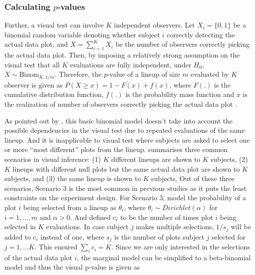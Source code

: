 \documentclass[]{interact}
\theoremstyle{plain}%
\theoremstyle{definition}
\theoremstyle{remark}
\begin{document}
\hypertarget{calculating-p-values}{%
\subsubsection{\texorpdfstring{Calculating
\(p\)-values}{Calculating p-values}}\label{calculating-p-values}}

Further, a visual test can involve \(K\) independent observers. Let
\(X_i = \{0,1\}\) be a binomial random variable denoting whether subject
\(i\) correctly detecting the actual data plot, and
\(X = \sum_{i=1}^{K}X_i\) be the number of observers correctly picking
the actual data plot. Then, by imposing a relatively strong assumption
on the visual test that all \(K\) evaluations are fully independent,
under \(H_0\), \(X \sim \mathrm{Binom}_{K,1/m}\). Therefore, the
\(p\)-value of a lineup of size \(m\) evaluated by \(K\) observer is
given as \(P(X \geq x) = 1 - F(x) + f(x)\), where \(F(.)\) is the
cumulative distribution function, \(f(.)\) is the probability mass
function and \(x\) is the realization of number of observers correctly
picking the actual data plot \citep{majumder_validation_2013}.

As pointed out by \citet{vanderplas2021statistical}, this basic binomial
model doesn't take into account the possible dependencies in the visual
test due to repeated evaluations of the same lineup. And it is
inapplicable to visual test where subjects are asked to select one or
more ``most different'' plots from the lineup.
\citet{vanderplas2021statistical} summarises three common scenarios in
visual inference: (1) \(K\) different lineups are shown to \(K\)
subjects, (2) \(K\) lineups with different null plots but the same
actual data plot are shown to \(K\) subjects, and (3) the same lineup is
shown to \(K\) subjects. Out of these three scenarios, Scenario 3 is the
most common in previous studies as it puts the least constraints on the
experiment design. For Scenario 3, \citet{vanderplas2021statistical}
model the probability of a plot \(i\) being selected from a lineup as
\(\theta_i\), where \(\theta_i \sim Dirichlet(\alpha)\) for
\(i=1,...,m\) and \(\alpha > 0\). And defined \(c_i\) to be the number
of times plot \(i\) being selected in \(K\) evaluations. In case subject
\(j\) makes multiple selections, \(1/s_j\) will be added to \(c_i\)
instead of one, where \(s_j\) is the number of plots subject \(j\)
selected for \(j=1,...K\). This ensured \(\sum_{i}c_i=K\). Since we are
only interested in the selections of the actual data plot \(i\), the
marginal model can be simplified to a beta-binomial model and thus the
visual p-value is given as
\end{document}

